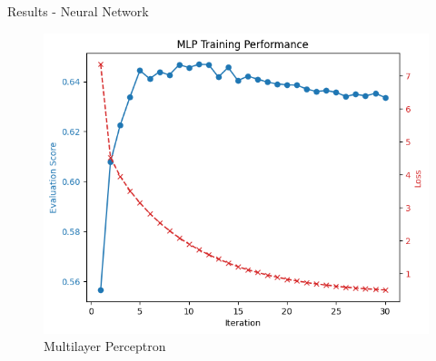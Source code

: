 \documentclass{beamer}
\begin{document}
\begin{frame}[t]{Results - Neural Network}
	\vspace{-3mm}
	\begin{figure}[h]
		\caption{Multilayer Perceptron}
		\centering
		\includegraphics[width=0.73\linewidth]{images/MLP/mlp_over_iters.png}
	\end{figure}
\end{frame}
\end{document}
